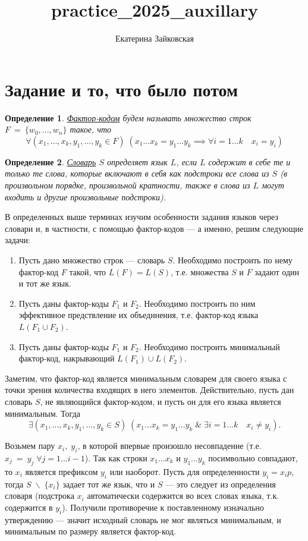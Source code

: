 \documentclass[14pt, russian]{scrartcl}
\title{practice\_2025\_auxillary}
\author{Екатерина Зайковская}
\newcounter{cDefinition}
\newtheorem{Definition}{Определение}[cDefinition]
\begin{document}
\section{Задание и то, что было потом}

\begin{Definition}
\label{f-c}
\underline{Фактор-кодом} будем называть множество строк $F~=~\{w_0, ..., w_n\}$ такое, 
что $$ \forall (x_1, ..., x_k, y_1, ..., y_k \in F) \; (x_1...x_k = y_1...y_k \implies \forall i = 1...k \quad x_i = y_i ) $$ 
\end{Definition}

\begin{Definition}
\label{Dict}
    \underline{Словарь} $S$ определяет язык $L$, если $L$ содержит в себе те и только те слова, которые включают в себя как подстроки все слова из $S$ (в произвольном порядке, произвольной кратности, также в слова из $L$ могут входить и другие произвольные подстроки). 
\end{Definition}

В определенных выше терминах изучим особенности задания языков через словари и, в частности, с помощью фактор-кодов --- а именно, решим следующие задачи:

\begin{enumerate}
    \item Пусть дано множество строк --- словарь $S$. Необходимо построить по нему фактор-код $F$ такой, что $L(F) = L(S)$, т.е. множества $S$ и $F$ задают один и тот же язык. 
    \item Пусть даны фактор-коды $F_1$ и $F_2$. Необходимо построить по ним эффективное предствление их объединения, т.е. фактор-код языка $L(F_1 \cup F_2 )$.
    \item Пусть даны фактор-коды $F_1$ и $F_2$. Необходимо построить минимальный фактор-код, накрывающий $L(F_1) \cup L(F_2)$. 
\end{enumerate}


Заметим, что фактор-код является минимальным словарем для своего языка с точки зрения количества входящих в него элементов. Действительно, пусть дан словарь $S$, не являющийся фактор-кодом, и пусть он для его языка является минимальным. Тогда 
$$ \exists (x_1, ..., x_k, y_1, ..., y_k \in S )\; (x_1...x_k = y_1...y_k \; \& \; \exists i = 1...k \quad x_i \neq y_i). $$

Возьмем пару $x_i, \; y_i$, в которой впервые произошло несовпадение (т.е. $x_j~=~y_j \; \forall j = 1...i-1$). Так как строки $x_1...x_k$ и $y_1...y_k$ посимвольно совпадают, то $x_i$ является префиксом $y_i$ или наоборот. Пусть для определенности $y_i = x_i p$, тогда $S \; \backslash \; \{x_i\}$ задает тот же язык, что и $S$ --- это следует из определения словаря (подстрока $x_i$ автоматически содержится во всех словах языка, т.к. содержится в $y_i$). Получили противоречие к поставленному изначально утверждению --- значит исходный словарь не мог являться минимальным, и минимальным по размеру является фактор-код.
\end{document}
